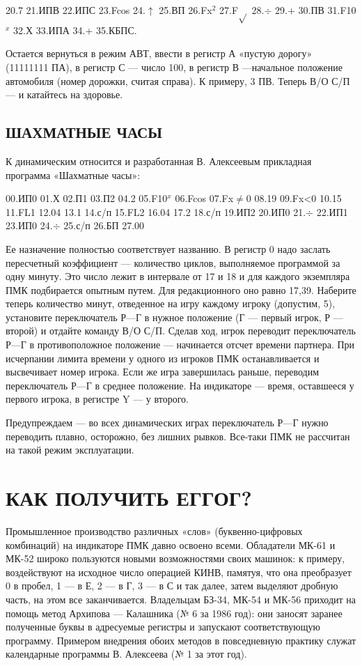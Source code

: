 \documentclass[11pt,a4paper,oneside]{article}
\begin{document}
20.7 21.ИПВ 22.ИПС 23.Fcos 24.$\uparrow$ 25.ВП 26.Fx$^{2}$ 27.F$\sqrt{}$ 28.$\div$ 29.+ 30.ПВ 31.F10$^{x}$ 32.Х 33.ИПА 34.+ 35.КБПС.

Остается вернуться в режим АВТ, ввести в регистр А «пустую дорогу» (11111111 ПА), в регистр С — число 100, в регистр В —начальное положение автомобиля (номер дорожки, считая справа). К примеру, 3 ПВ. Теперь В/О С/П — и катайтесь на здоровье.

\subsection{ШАХМАТНЫЕ ЧАСЫ}
К динамическим относится и разработанная В. Алексеевым прикладная программа «Шахматные часы»:

00.ИП0 01.Х 02.П1 03.П2 04.2 05.F10$^{x}$ 06.Fcos
07.Fx$\neq$0 08.19 09.Fx<0 10.15 11.FL1 12.04 13.1 14.с/п 15.FL2 16.04 17.2 18.с/п 19.ИП2 20.ИП0 21.$\div$ 22.ИП1 23.ИП0 24.$\div$ 25.с/п 26.БП 27.00

Ее назначение полностью соответствует названию. В регистр 0 надо заслать пересчетный коэффициент — количество циклов, выполняемое программой за одну минуту. Это число лежит в интервале от 17 и 18 и для каждого экземпляра ПМК подбирается опытным путем. Для редакционного оно равно 17,39. Наберите теперь количество минут, отведенное на игру каждому игроку (допустим, 5), установите переключатель Р—Г в нужное положение (Г — первый игрок, Р — второй) и отдайте команду В/О С/П. Сделав ход, игрок переводит переключатель Р—Г в противоположное положение — начинается отсчет времени партнера. При исчерпании лимита времени у одного из игроков ПМК останавливается и высвечивает номер игрока. Если же игра завершилась раньше, переводим переключатель Р—Г в среднее положение. На индикаторе — время, оставшееся у первого игрока, в регистре Y — у второго.

Предупреждаем — во всех динамических играх переключатель Р—Г нужно переводить плавно, осторожно, без лишних рывков. Все-таки ПМК не рассчитан на такой режим эксплуатации.

\section{КАК ПОЛУЧИТЬ ЕГГОГ?}
Промышленное производство различных «слов» (буквенно-цифровых комбинаций) на индикаторе ПМК давно освоено всеми. Обладатели МК-61 и МК-52 широко пользуются новыми возможностями своих машинок: к примеру, воздействуют на исходное число операцией КИНВ, памятуя, что она преобразует 0 в пробел, 1 — в Е, 2 — в Г, 3 — в С и так далее, затем выделяют дробную часть, на этом все заканчивается. Владельцам БЗ-34, МК-54 и МК-56 приходит на помощь метод Архипова — Калашника (№ 6 за 1986 год): они заносят заранее полученные буквы в адресуемые регистры и запускают соответствующую программу. Примером внедрения обоих методов в повседневную практику служат календарные программы В. Алексеева (№ 1 за этот год).
\end{document}
